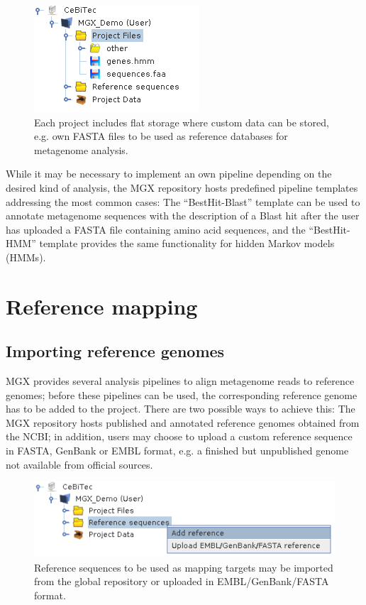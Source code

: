 \begin{figure}[H]
\centering
\includegraphics[width=.45\textwidth]{img/mgx/serverfs}
\caption[File storage]{Each project includes flat storage where custom
data can be stored, e.g. own FASTA files to be used as reference databases
for metagenome analysis.}
\label{serverfs}
\end{figure}

While it may be necessary to implement an own pipeline depending on the
desired kind of analysis, the MGX repository hosts predefined pipeline
templates addressing the most common cases: The ``BestHit-Blast'' template
can be used to annotate metagenome sequences with the description of a
Blast hit after the user has uploaded a FASTA file containing amino acid
sequences, and the ``BestHit-HMM'' template provides the same functionality
for hidden Markov models (HMMs).


\section{Reference mapping}

\subsection{Importing reference genomes}

MGX provides several analysis pipelines to align metagenome reads to reference genomes;
before these pipelines can be used, the corresponding reference genome has to be added
to the project. There are two possible ways to achieve this: The MGX repository hosts
published and annotated reference genomes obtained from the NCBI; in addition, users
may choose to upload a custom reference sequence in FASTA, GenBank or EMBL format, e.g.
a finished but unpublished genome not available from official sources.\\

\begin{figure}[H]
\centering
\includegraphics[width=.9\textwidth]{img/mgx/addReference}
\caption[Reference import]{Reference sequences to be used as mapping targets may be
imported from the global repository or uploaded in EMBL/GenBank/FASTA format.}
\label{addref}
\end{figure}

